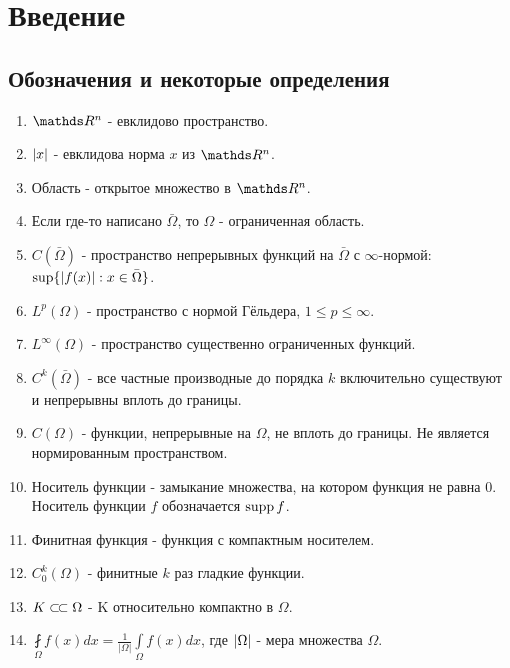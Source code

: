 \chapter*{Введение}
\section*{Обозначения и некоторые определения}
\begin{enumerate}
\item $\real^n$ - евклидово пространство.
\item $\lvert x\rvert$ - евклидова норма $x$ из $\real^n$.
\item Область - открытое множество в $\real^n$.
\item Если где-то написано $\bar{\Omega}$, то $\Omega$ - ограниченная область.
\item $C(\bar{\Omega})$ - пространство непрерывных функций на $\bar{\Omega}$ с $\infty$-нормой: $\sup \{ \lvert f(x)\rvert : x \in \bar{\Omega} \}$.
\item $L^p (\Omega)$ - пространство с нормой Гёльдера, $1 \leq p \leq \infty$.
\item $L^\infty (\Omega)$ - пространство существенно ограниченных функций.
\item $C^k(\bar{\Omega})$ - все частные производные до порядка $k$ включительно существуют и непрерывны вплоть до границы.
\item $C(\Omega)$ - функции, непрерывные на $\Omega$, не вплоть до границы. Не является нормированным пространством.
\item Носитель функции - замыкание множества, на котором функция не равна $0$. Носитель функции $f$ обозначается $\operatorname{supp} f$.
\item Финитная функция - функция с компактным носителем.
\item $C^k_0(\Omega)$ - финитные $k$ раз гладкие функции.
\item $K \ssubset \Omega$ - K относительно компактно в $\Omega$.
\item $\displaystyle \fint \limits_{\Omega} f(x) dx = \frac{1}{|\Omega|} \int \limits_{\Omega} f(x) dx$, где $\lvert\Omega\rvert$ - мера множества $\Omega$.
\end{enumerate}

